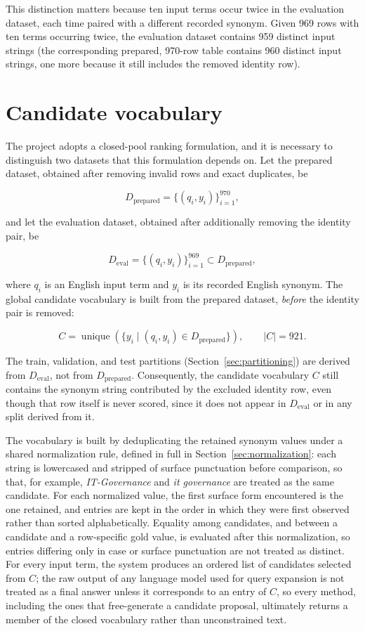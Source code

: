 This distinction matters because ten input terms occur twice in the evaluation dataset, each time paired with a different recorded synonym. Given 969 rows with ten terms occurring twice, the evaluation dataset contains 959 distinct input strings (the corresponding prepared, 970-row table contains 960 distinct input strings, one more because it still includes the removed identity row).

\section{Candidate vocabulary}
\label{sec:candidate-vocab}

The project adopts a closed-pool ranking formulation, and it is necessary to distinguish two datasets that this formulation depends on. Let the prepared dataset, obtained after removing invalid rows and exact duplicates, be

\[ D_{\mathrm{prepared}} = \{(q_i, y_i)\}_{i=1}^{970}, \]

and let the evaluation dataset, obtained after additionally removing the identity pair, be

\[ D_{\mathrm{eval}} = \{(q_i, y_i)\}_{i=1}^{969} \subset D_{\mathrm{prepared}}, \]

where $q_i$ is an English input term and $y_i$ is its recorded English synonym. The global candidate vocabulary is built from the prepared dataset, \emph{before} the identity pair is removed:

\[ C = \operatorname{unique}\left(\{y_i \mid (q_i,y_i) \in D_{\mathrm{prepared}}\}\right), \qquad |C| = 921. \]

The train, validation, and test partitions (Section~\ref{sec:partitioning}) are derived from $D_{\mathrm{eval}}$, not from $D_{\mathrm{prepared}}$. Consequently, the candidate vocabulary $C$ still contains the synonym string contributed by the excluded identity row, even though that row itself is never scored, since it does not appear in $D_{\mathrm{eval}}$ or in any split derived from it.

The vocabulary is built by deduplicating the retained synonym values under a shared normalization rule, defined in full in Section~\ref{sec:normalization}: each string is lowercased and stripped of surface punctuation before comparison, so that, for example, \emph{IT-Governance} and \emph{it governance} are treated as the same candidate. For each normalized value, the first surface form encountered is the one retained, and entries are kept in the order in which they were first observed rather than sorted alphabetically. Equality among candidates, and between a candidate and a row-specific gold value, is evaluated after this normalization, so entries differing only in case or surface punctuation are not treated as distinct. For every input term, the system produces an ordered list of candidates selected from $C$; the raw output of any language model used for query expansion is not treated as a final answer unless it corresponds to an entry of $C$, so every method, including the ones that free-generate a candidate proposal, ultimately returns a member of the closed vocabulary rather than unconstrained text.

